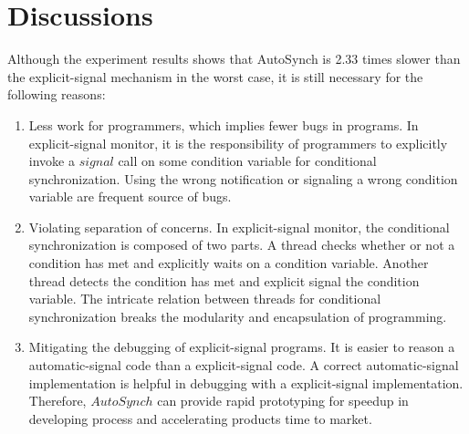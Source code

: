 \documentclass[preprint]{sigplanconf}
\begin{document}
\section{Discussions} \label{sec:dis}
Although the experiment results shows that AutoSynch is 2.33 times slower than 
the explicit-signal mechanism in the worst case, it is still necessary for the 
following reasons: 
\begin{enumerate}
    \item Less work for programmers, which implies fewer bugs in programs.
        In explicit-signal monitor, it is the responsibility of programmers to 
        explicitly invoke a $signal$ call on some condition variable for
        conditional synchronization. Using the wrong notification or signaling
        a wrong condition variable are frequent source of bugs. 
    \item Violating separation of concerns. In explicit-signal monitor, the
        conditional synchronization is composed of two parts. A thread checks
        whether or not a condition has met and explicitly waits on a
        condition variable. Another thread detects the condition has met and
        explicit signal the condition variable. The intricate relation between
        threads for conditional synchronization breaks the modularity and 
        encapsulation of programming.  
    \item Mitigating the debugging of explicit-signal programs. It is easier to
        reason a automatic-signal code than a explicit-signal code. A correct
        automatic-signal implementation is helpful in debugging with a 
        explicit-signal implementation. Therefore, $AutoSynch$ can provide  
        rapid prototyping for speedup in developing process and accelerating 
        products time to market.
\end{enumerate}



\end{document}
